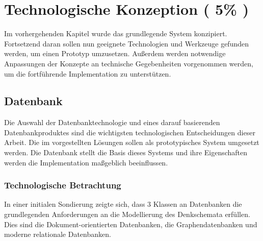 \chapter{Technologische Konzeption ( 5\% )}


Im vorhergehenden Kapitel wurde das grundlegende System konzipiert.
Fortsetzend daran sollen nun geeignete Technologien und Werkzeuge gefunden werden,
um einen Prototyp umzusetzen.
Außerdem werden notwendige Anpassungen der Konzepte an technische Gegebenheiten vorgenommen werden,
um die fortf\"uhrende Implementation zu unterst\"utzen.





\section{Datenbank}

Die Auswahl der Datenbanktechnologie und eines darauf basierenden Datenbankproduktes sind die wichtigsten technologischen Entscheidungen dieser Arbeit.
Die im  vorgestellten Lösungen sollen als prototypisches System umgesetzt werden.
Die Datenbank stellt die Basis dieses Systems und ihre Eigenschaften werden die Implementation maßgeblich beeinflussen.


\subsection{Technologische Betrachtung}

In einer initialen Sondierung zeigte sich,
dass 3 Klassen an Datenbanken die grundlegenden Anforderungen an die Modellierung des Denkschemata erfüllen.
Dies sind die Dokument-orientierten Datenbanken, die Graphendatenbanken und moderne relationale Datenbanken. 


